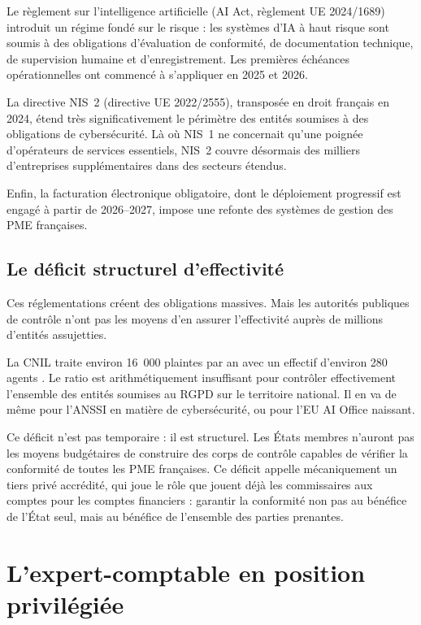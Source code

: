 \documentclass[12pt,a4paper]{article}
\begin{document}
Le règlement sur l'intelligence artificielle (AI Act, règlement UE 2024/1689) introduit un régime fondé sur le risque : les systèmes d'IA à haut risque sont soumis à des obligations d'évaluation de conformité, de documentation technique, de supervision humaine et d'enregistrement. Les premières échéances opérationnelles ont commencé à s'appliquer en 2025 et 2026.

La directive NIS~2 (directive UE 2022/2555), transposée en droit français en 2024, étend très significativement le périmètre des entités soumises à des obligations de cybersécurité. Là où NIS~1 ne concernait qu'une poignée d'opérateurs de services essentiels, NIS~2 couvre désormais des milliers d'entreprises supplémentaires dans des secteurs étendus.

Enfin, la facturation électronique obligatoire, dont le déploiement progressif est engagé à partir de 2026--2027, impose une refonte des systèmes de gestion des PME françaises.

\subsection{Le déficit structurel d'effectivité}

Ces réglementations créent des obligations massives. Mais les autorités publiques de contrôle n'ont pas les moyens d'en assurer l'effectivité auprès de millions d'entités assujetties.

La CNIL traite environ 16~000 plaintes par an avec un effectif d'environ 280 agents \parencite{cnil2024}. Le ratio est arithmétiquement insuffisant pour contrôler effectivement l'ensemble des entités soumises au RGPD sur le territoire national. Il en va de même pour l'ANSSI en matière de cybersécurité, ou pour l'EU AI Office naissant.

Ce déficit n'est pas temporaire : il est structurel. Les États membres n'auront pas les moyens budgétaires de construire des corps de contrôle capables de vérifier la conformité de toutes les PME françaises. Ce déficit appelle mécaniquement un tiers privé accrédité, qui joue le rôle que jouent déjà les commissaires aux comptes pour les comptes financiers : garantir la conformité non pas au bénéfice de l'État seul, mais au bénéfice de l'ensemble des parties prenantes.

\section{L'expert-comptable en position privilégiée}
\end{document}
